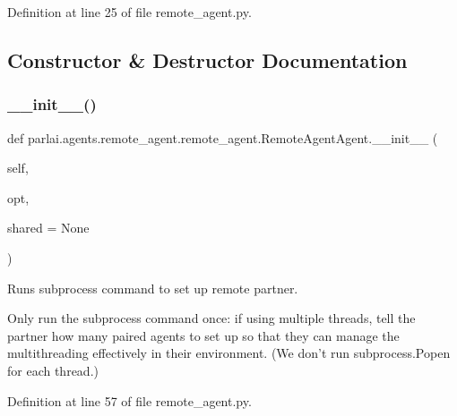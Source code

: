 Definition at line 25 of file remote\+\_\+agent.\+py.



\subsection{Constructor \& Destructor Documentation}
\mbox{\label{classparlai_1_1agents_1_1remote__agent_1_1remote__agent_1_1RemoteAgentAgent_ae8bb1c57f4ed83b9aba132c486201d93}} 
\subsubsection{\texorpdfstring{\+\_\+\+\_\+init\+\_\+\+\_\+()}{\_\_init\_\_()}}
{\footnotesize\ttfamily def parlai.\+agents.\+remote\+\_\+agent.\+remote\+\_\+agent.\+Remote\+Agent\+Agent.\+\_\+\+\_\+init\+\_\+\+\_\+ (\begin{DoxyParamCaption}\item[{}]{self,  }\item[{}]{opt,  }\item[{}]{shared = {\ttfamily None} }\end{DoxyParamCaption})}

\begin{DoxyVerb}Runs subprocess command to set up remote partner.

Only run the subprocess command once: if using multiple threads, tell the
partner how many paired agents to set up so that they can manage the
multithreading effectively in their environment. (We don't run subprocess.Popen
for each thread.)
\end{DoxyVerb}
 

Definition at line 57 of file remote\+\_\+agent.\+py.


